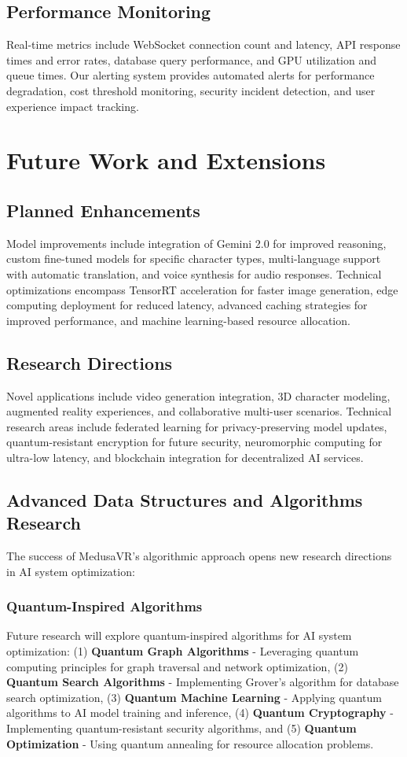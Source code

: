 \documentclass[conference]{IEEEtran}
\begin{document}
\subsection{Performance Monitoring}
Real-time metrics include WebSocket connection count and latency, API response times and error rates, database query performance, and GPU utilization and queue times. Our alerting system provides automated alerts for performance degradation, cost threshold monitoring, security incident detection, and user experience impact tracking.

\section{Future Work and Extensions}

\subsection{Planned Enhancements}
Model improvements include integration of Gemini 2.0 for improved reasoning, custom fine-tuned models for specific character types, multi-language support with automatic translation, and voice synthesis for audio responses. Technical optimizations encompass TensorRT acceleration for faster image generation, edge computing deployment for reduced latency, advanced caching strategies for improved performance, and machine learning-based resource allocation.

\subsection{Research Directions}
Novel applications include video generation integration, 3D character modeling, augmented reality experiences, and collaborative multi-user scenarios. Technical research areas include federated learning for privacy-preserving model updates, quantum-resistant encryption for future security, neuromorphic computing for ultra-low latency, and blockchain integration for decentralized AI services.

\subsection{Advanced Data Structures and Algorithms Research}
The success of MedusaVR's algorithmic approach opens new research directions in AI system optimization:

\subsubsection{Quantum-Inspired Algorithms}
Future research will explore quantum-inspired algorithms for AI system optimization: (1) \textbf{Quantum Graph Algorithms} - Leveraging quantum computing principles for graph traversal and network optimization, (2) \textbf{Quantum Search Algorithms} - Implementing Grover's algorithm for database search optimization, (3) \textbf{Quantum Machine Learning} - Applying quantum algorithms to AI model training and inference, (4) \textbf{Quantum Cryptography} - Implementing quantum-resistant security algorithms, and (5) \textbf{Quantum Optimization} - Using quantum annealing for resource allocation problems.
\end{document}
